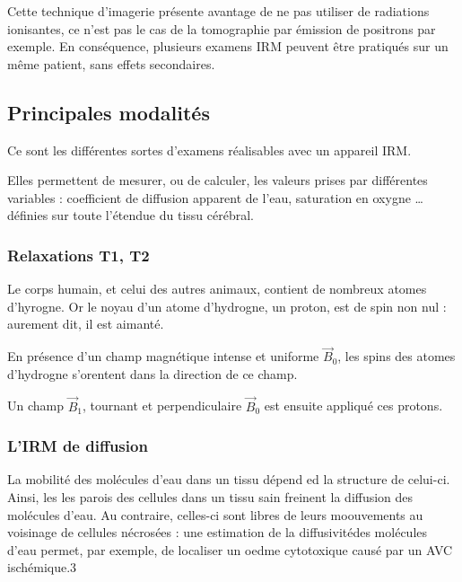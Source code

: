 \par
Cette technique d'imagerie pr\'esente avantage de ne pas utiliser de radiations ionisantes, %
ce n'est pas le cas de la tomographie par \'emission de positrons par exemple. %
En cons\'equence, plusieurs examens IRM peuvent \^etre pratiqu\'es sur un m\^eme patient, sans effets secondaires.

\subsection{Principales modalit\'es}

Ce sont les diff\'erentes sortes d'examens r\'ealisables avec un appareil IRM.

\par
Elles permettent de mesurer, ou de calculer, les valeurs prises par diff\'erentes variables : %
coefficient de diffusion apparent de l'eau, saturation en oxygne \dots %
d\'efinies sur toute l'\'etendue du tissu c\'er\'ebral.

\subsubsection{Relaxations T1, T2}

Le corps humain, et celui des autres animaux, contient de nombreux atomes d'hyrogne. %
Or le noyau d'un atome d'hydrogne, un proton, est de spin non nul : aurement dit, il est aimant\'e.

\par
En pr\'esence d'un champ magn\'etique intense et uniforme $\vec{B}_0$, les spins des atomes d'hydrogne s'orentent dans la direction de ce champ.

\par
Un champ $\vec{B}_1$, tournant et perpendiculaire  $\vec{B}_0$ est ensuite appliqu\'e  ces protons. %



\subsubsection{L'IRM de diffusion}

La mobilit\'e des mol\'ecules d'eau dans un tissu d\'epend ed la structure de celui-ci. %
Ainsi, les les parois des cellules dans un tissu sain freinent la diffusion des mol\'ecules d'eau. %
Au contraire, celles-ci sont libres de leurs moouvements au voisinage de cellules n\'ecros\'ees : %
une estimation de la diffusivit\'edes mol\'ecules d'eau permet, par exemple, de localiser un oedme cytotoxique caus\'e par un AVC isch\'emique.3

